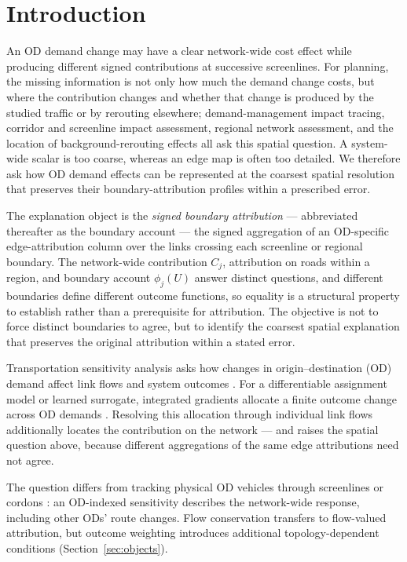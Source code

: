 \documentclass[a4paper,fleqn]{cas-sc}
\begin{document}
\section{Introduction}\label{sec:intro}
An OD demand change may have a clear network-wide cost effect while
producing different signed contributions at successive screenlines. For
planning, the missing information is not only how much the demand change
costs, but where the contribution changes and whether that change is
produced by the studied traffic or by rerouting elsewhere; demand-management
impact tracing, corridor and screenline impact assessment, regional network
assessment, and the location of background-rerouting effects all ask this
spatial question. A system-wide scalar is too coarse, whereas an edge map
is often too detailed. We therefore ask how OD demand effects can be
represented at the coarsest spatial resolution that preserves their
boundary-attribution profiles within a prescribed error.

The explanation object is the \emph{signed boundary attribution} ---
abbreviated thereafter as the boundary account --- the signed aggregation
of an OD-specific edge-attribution column over the links crossing each
screenline or regional boundary. The network-wide contribution $C_j$,
attribution on roads within a region, and boundary account $\phi_j(U)$
answer distinct questions, and different boundaries define different
outcome functions, so equality is a structural property to establish
rather than a prerequisite for attribution. The objective is not to
force distinct boundaries to agree, but to identify the coarsest spatial
explanation that preserves the original attribution within a stated
error.

Transportation sensitivity analysis asks how changes in origin--destination
(OD) demand affect link flows and system outcomes
\citep{tobin1988sensitivity,josefsson2007sensitivity,patriksson2003aggregated}.
For a differentiable assignment model or learned surrogate, integrated
gradients allocate a finite outcome change across OD demands
\citep{sundararajan2017axiomatic}. Resolving this allocation through
individual link flows additionally locates the contribution on the
network --- and raises the spatial question above, because different
aggregations of the same edge attributions need not agree.

The question differs from tracking physical OD vehicles through screenlines
or cordons \citep{sheffi1985urban,vanzuylen1980most,bar2002origin}:
an OD-indexed sensitivity describes the network-wide response,
including other ODs' route changes. Flow conservation transfers to
flow-valued attribution, but outcome weighting introduces additional
topology-dependent conditions (Section~\ref{sec:objects}).
\end{document}
